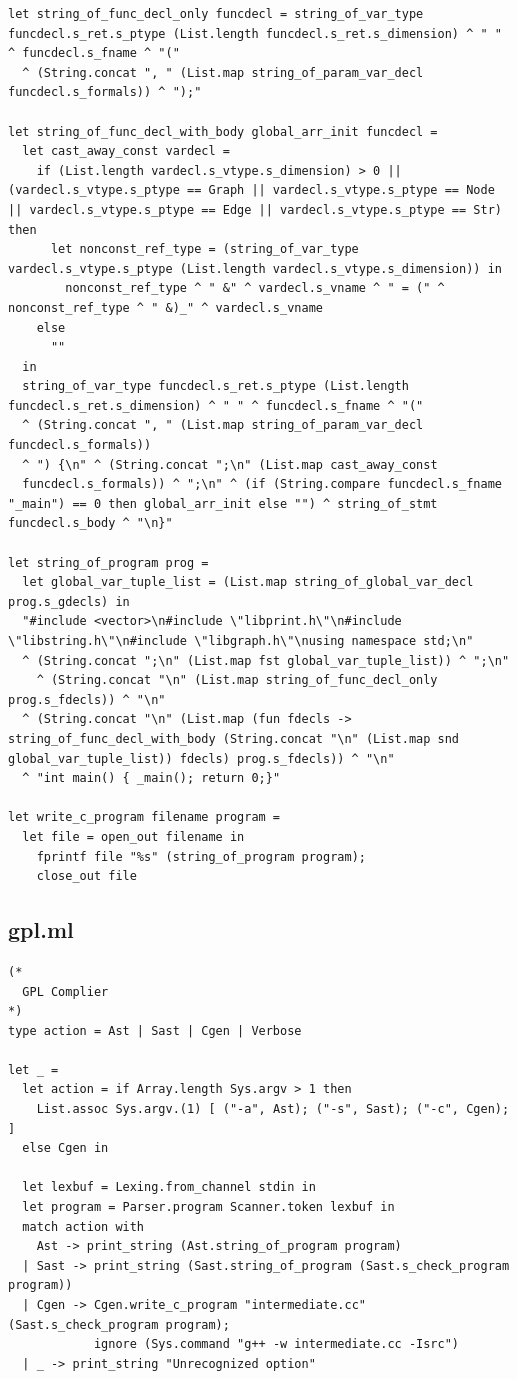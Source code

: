\documentclass[a4paper,12pt]{article}
\begin{document}
\begin{lstlisting}
let string_of_func_decl_only funcdecl = string_of_var_type funcdecl.s_ret.s_ptype (List.length funcdecl.s_ret.s_dimension) ^ " " ^ funcdecl.s_fname ^ "(" 
  ^ (String.concat ", " (List.map string_of_param_var_decl funcdecl.s_formals)) ^ ");"

let string_of_func_decl_with_body global_arr_init funcdecl =
  let cast_away_const vardecl =  
    if (List.length vardecl.s_vtype.s_dimension) > 0 || (vardecl.s_vtype.s_ptype == Graph || vardecl.s_vtype.s_ptype == Node || vardecl.s_vtype.s_ptype == Edge || vardecl.s_vtype.s_ptype == Str) then
      let nonconst_ref_type = (string_of_var_type vardecl.s_vtype.s_ptype (List.length vardecl.s_vtype.s_dimension)) in
        nonconst_ref_type ^ " &" ^ vardecl.s_vname ^ " = (" ^ nonconst_ref_type ^ " &)_" ^ vardecl.s_vname
    else
      ""
  in
  string_of_var_type funcdecl.s_ret.s_ptype (List.length funcdecl.s_ret.s_dimension) ^ " " ^ funcdecl.s_fname ^ "(" 
  ^ (String.concat ", " (List.map string_of_param_var_decl funcdecl.s_formals))
  ^ ") {\n" ^ (String.concat ";\n" (List.map cast_away_const
  funcdecl.s_formals)) ^ ";\n" ^ (if (String.compare funcdecl.s_fname "_main") == 0 then global_arr_init else "") ^ string_of_stmt funcdecl.s_body ^ "\n}"

let string_of_program prog =
  let global_var_tuple_list = (List.map string_of_global_var_decl prog.s_gdecls) in
  "#include <vector>\n#include \"libprint.h\"\n#include \"libstring.h\"\n#include \"libgraph.h\"\nusing namespace std;\n"
  ^ (String.concat ";\n" (List.map fst global_var_tuple_list)) ^ ";\n"
	^ (String.concat "\n" (List.map string_of_func_decl_only prog.s_fdecls)) ^ "\n"
  ^ (String.concat "\n" (List.map (fun fdecls -> string_of_func_decl_with_body (String.concat "\n" (List.map snd global_var_tuple_list)) fdecls) prog.s_fdecls)) ^ "\n"
  ^ "int main() { _main(); return 0;}"

let write_c_program filename program =
  let file = open_out filename in
    fprintf file "%s" (string_of_program program);
    close_out file
\end{lstlisting}

\subsection{gpl.ml}
\begin{lstlisting}
(*
  GPL Complier
*)
type action = Ast | Sast | Cgen | Verbose

let _ =
  let action = if Array.length Sys.argv > 1 then
    List.assoc Sys.argv.(1) [ ("-a", Ast); ("-s", Sast); ("-c", Cgen); ]
  else Cgen in
  
  let lexbuf = Lexing.from_channel stdin in
  let program = Parser.program Scanner.token lexbuf in
  match action with
    Ast -> print_string (Ast.string_of_program program)
  | Sast -> print_string (Sast.string_of_program (Sast.s_check_program program))
  | Cgen -> Cgen.write_c_program "intermediate.cc" (Sast.s_check_program program);
            ignore (Sys.command "g++ -w intermediate.cc -Isrc")
  | _ -> print_string "Unrecognized option"
\end{lstlisting}
\end{document}
